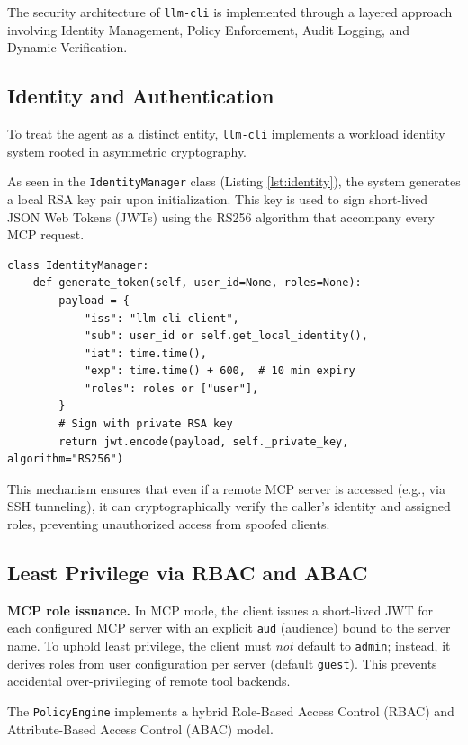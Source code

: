 \documentclass[conference]{IEEEtran}
\begin{document}
The security architecture of \texttt{llm-cli} is implemented through a layered approach involving Identity Management, Policy Enforcement, Audit Logging, and Dynamic Verification.

\subsection{Identity and Authentication}
To treat the agent as a distinct entity, \texttt{llm-cli} implements a workload identity system rooted in asymmetric cryptography.

As seen in the \texttt{IdentityManager} class (Listing \ref{lst:identity}), the system generates a local RSA key pair upon initialization. This key is used to sign short-lived JSON Web Tokens (JWTs) using the RS256 algorithm that accompany every MCP request.

\begin{lstlisting}[caption={Identity Token Generation in identity.py}, label={lst:identity}]
class IdentityManager:
    def generate_token(self, user_id=None, roles=None):
        payload = {
            "iss": "llm-cli-client",
            "sub": user_id or self.get_local_identity(),
            "iat": time.time(),
            "exp": time.time() + 600,  # 10 min expiry
            "roles": roles or ["user"],
        }
        # Sign with private RSA key
        return jwt.encode(payload, self._private_key, algorithm="RS256")
\end{lstlisting}

This mechanism ensures that even if a remote MCP server is accessed (e.g., via SSH tunneling), it can cryptographically verify the caller's identity and assigned roles, preventing unauthorized access from spoofed clients.

\subsection{Least Privilege via RBAC and ABAC}
\textbf{MCP role issuance.} In MCP mode, the client issues a short-lived JWT for each configured MCP server with an explicit \texttt{aud} (audience) bound to the server name. To uphold least privilege, the client must \emph{not} default to \texttt{admin}; instead, it derives roles from user configuration per server (default \texttt{guest}). This prevents accidental over-privileging of remote tool backends.

The \texttt{PolicyEngine} implements a hybrid Role-Based Access Control (RBAC) and Attribute-Based Access Control (ABAC) model.
\end{document}
